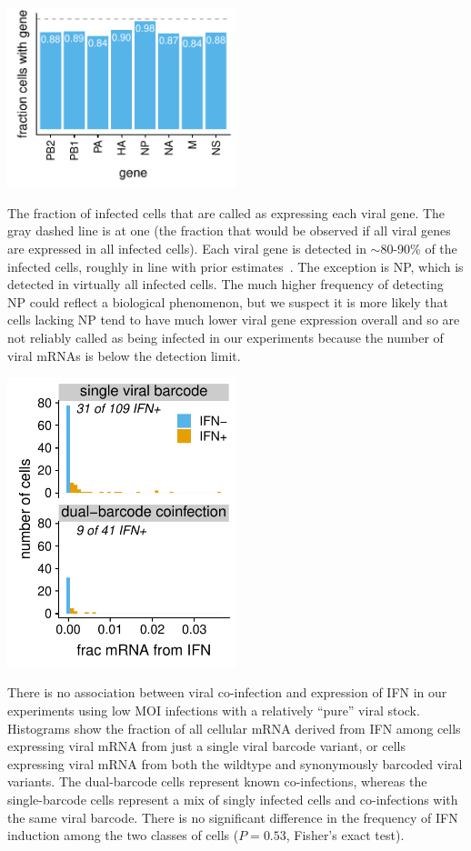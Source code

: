 \documentclass[lineno]{asm-article}
\begin{document}
\begin{suppfig}
\includegraphics[width=0.5\textwidth]{figures/single_cell_figures/p_frac_has_gene.pdf}
\caption{
The fraction of infected cells that are called as expressing each viral gene.
The gray dashed line is at one (the fraction that would be observed if all viral genes are expressed in all infected cells).
Each viral gene is detected in $\sim$80-90\% of the infected cells, roughly in line with prior estimates~\cite{brooke2013most, heldt2015single, dou2017analysis, russell2018extreme}.
The exception is NP, which is detected in virtually all infected cells.
The much higher frequency of detecting NP could reflect a biological phenomenon, but we suspect it is more likely that cells lacking NP tend to have much lower viral gene expression overall and so are not reliably called as being infected in our experiments because the number of viral mRNAs is below the detection limit.}
\label{suppfig:frac_has_gene}
\end{suppfig}

\begin{suppfig}
\includegraphics[width=0.5\textwidth]{figures/single_cell_figures/p_frac_ifn_coinfect.pdf}
\caption{
There is no association between viral co-infection and expression of IFN in our experiments using low MOI infections with a relatively ``pure'' viral stock.
Histograms show the fraction of all cellular mRNA derived from IFN among cells expressing viral mRNA from just a single viral barcode variant, or cells expressing viral mRNA from both the wildtype and synonymously barcoded viral variants.
The dual-barcode cells represent known co-infections, whereas the single-barcode cells represent a mix of singly infected cells and co-infections with the same viral barcode.
There is no significant difference in the frequency of IFN induction among the two classes of cells ($P = 0.53$, Fisher's exact test). 
}
\label{suppfig:coinf_IFN}
\end{suppfig}
\end{document}
